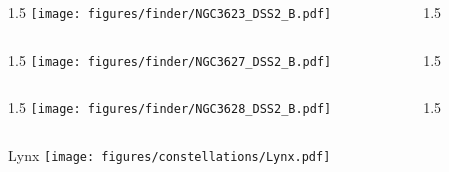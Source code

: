 \documentclass[final]{beamer}
\newlength{\colwidth}
\begin{document}

\begin{frame}[t]{}
  \begin{columns}[T]
    \begin{column}{1.5\colwidth}
      \centering
      \texttt{[image: figures/finder/NGC3623\_DSS2\_B.pdf]}
    \end{column}
    \begin{column}{1.5\colwidth}
      \Large
      
    \end{column}
  \end{columns}
  \vspace{\fill}
  \begin{columns}[T]
    \begin{column}{1.5\colwidth}
      \centering
      \texttt{[image: figures/finder/NGC3627\_DSS2\_B.pdf]}
    \end{column}
    \begin{column}{1.5\colwidth}
      \Large
      
    \end{column}
  \end{columns}
\end{frame}


\begin{frame}[t]{}
  \begin{columns}[T]
    \begin{column}{1.5\colwidth}
      \centering
      \texttt{[image: figures/finder/NGC3628\_DSS2\_B.pdf]}
    \end{column}
    \begin{column}{1.5\colwidth}
      \Large
      
    \end{column}
  \end{columns}
  \vspace{\fill}
\end{frame}


\begin{frame}[t]{\LARGE Lynx}
  \centering
  \texttt{[image: figures/constellations/Lynx.pdf]}
\end{frame}
\end{document}
